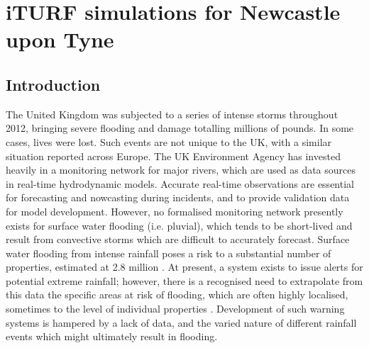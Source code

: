 \chapter{iTURF simulations for Newcastle upon Tyne}

\section{Introduction}

The United Kingdom was subjected to a series of intense storms throughout 2012, bringing severe flooding and damage totalling millions of pounds. In some cases, lives were lost. Such events are not unique to the UK, with a similar situation reported across Europe. The UK Environment Agency has invested heavily in a monitoring network for major rivers, which are used as data sources in real-time hydrodynamic models. Accurate real-time observations are essential for forecasting and nowcasting during incidents, and to provide validation data for model development. However, no formalised monitoring network presently exists for surface water flooding (i.e. pluvial), which tends to be short-lived and result from convective storms which are difficult to accurately forecast. Surface water flooding from intense rainfall poses a risk to a substantial number of properties, estimated at 2.8 million \citep{Pitt2007,EnvironmentAgency2009a}. At present, a system exists to issue alerts for potential extreme rainfall; however, there is a recognised need to extrapolate from this data the specific areas at risk of flooding, which are often highly localised, sometimes to the level of individual properties \citep{Pitt2007,Golding2009}. Development of such warning systems is hampered by a lack of data, and the varied nature of different rainfall events which might ultimately result in flooding.

